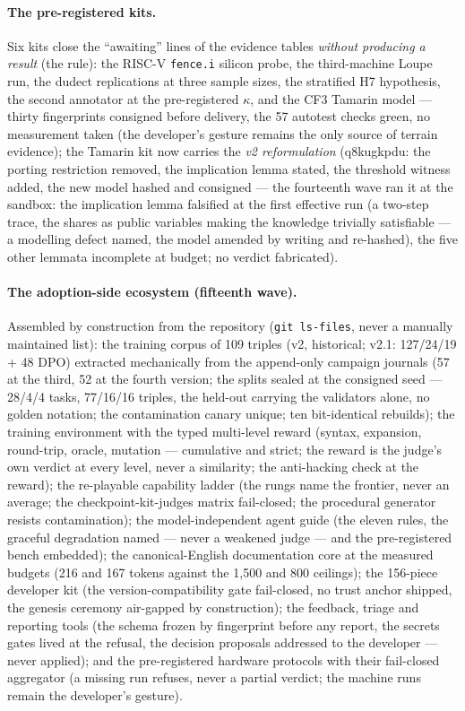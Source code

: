 \documentclass[10pt,a4paper]{article}
\newcommand{\code}[1]{\texttt{\small #1}}
\begin{document}
\paragraph{The pre-registered kits.} Six kits close the ``awaiting''
lines of the evidence tables \emph{without producing a result} (the
rule): the RISC-V \code{fence.i} silicon probe, the third-machine
Loupe run, the dudect replications at three sample sizes, the
stratified H7 hypothesis, the second annotator at the pre-registered
$\kappa$, and the CF3 Tamarin model --- thirty fingerprints consigned
before delivery, the 57 autotest checks green, no measurement taken
(the developer's gesture remains the only source of terrain
evidence); the Tamarin kit now carries the \emph{v2 reformulation}
(q8kugkpdu: the porting restriction removed, the implication lemma
stated, the threshold witness added, the new model hashed and
consigned --- the fourteenth wave ran it at the sandbox: the implication
lemma falsified at the first effective run (a two-step trace, the shares
as public variables making the knowledge trivially satisfiable --- a
modelling defect named, the model amended by writing and re-hashed),
the five other lemmata incomplete at budget; no verdict fabricated).
\paragraph{The adoption-side ecosystem (fifteenth wave).} Assembled
by construction from the repository (\code{git ls-files}, never a
manually maintained list): the training corpus of 109 triples (v2, historical; v2.1: 127/24/19 + 48 DPO)
extracted mechanically from the append-only campaign journals (57 at
the third, 52 at the fourth version; the splits sealed at the
consigned seed --- 28/4/4 tasks, 77/16/16 triples, the held-out
carrying the validators alone, no golden notation; the contamination
canary unique; ten bit-identical rebuilds); the training environment
with the typed multi-level reward (syntax, expansion, round-trip,
oracle, mutation --- cumulative and strict; the reward is the judge's
own verdict at every level, never a similarity; the anti-hacking
check at the reward); the re-playable capability ladder (the rungs
name the frontier, never an average; the checkpoint-kit-judges matrix
fail-closed; the procedural generator resists contamination); the
model-independent agent guide (the eleven rules, the graceful
degradation named --- never a weakened judge --- and the pre-registered
bench embedded); the canonical-English documentation core at the
measured budgets (216 and 167 tokens against the 1{,}500 and 800
ceilings); the 156-piece developer kit (the version-compatibility
gate fail-closed, no trust anchor shipped, the genesis ceremony
air-gapped by construction); the feedback, triage and reporting tools
(the schema frozen by fingerprint before any report, the secrets
gates lived at the refusal, the decision proposals addressed to the
developer --- never applied); and the pre-registered hardware
protocols with their fail-closed aggregator (a missing run refuses,
never a partial verdict; the machine runs remain the developer's
gesture).
\end{document}
